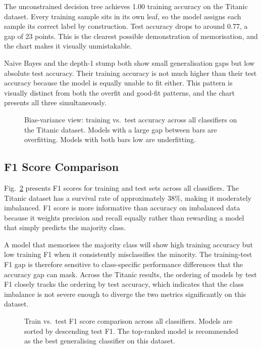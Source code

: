 \documentclass[conference]{IEEEtran}
\begin{document}
The unconstrained decision tree achieves 1.00 training accuracy on the Titanic dataset. Every training sample sits in its own leaf, so the model assigns each sample its correct label by construction. Test accuracy drops to around 0.77, a gap of 23 points. This is the clearest possible demonstration of memorisation, and the chart makes it visually unmistakable.

Naive Bayes and the depth-1 stump both show small generalisation gaps but low absolute test accuracy. Their training accuracy is not much higher than their test accuracy because the model is equally unable to fit either. This pattern is visually distinct from both the overfit and good-fit patterns, and the chart presents all three simultaneously.

\begin{figure}[t]
    \centering
    \caption{Bias-variance view: training vs.\ test accuracy across all classifiers on the Titanic dataset. Models with a large gap between bars are overfitting. Models with both bars low are underfitting.}
    \label{fig:bv_chart}
\end{figure}

\subsection{F1 Score Comparison}

Fig.~\ref{fig:f1_chart} presents F1 scores for training and test sets across all classifiers. The Titanic dataset has a survival rate of approximately 38\%, making it moderately imbalanced. F1 score is more informative than accuracy on imbalanced data because it weights precision and recall equally rather than rewarding a model that simply predicts the majority class.

A model that memorises the majority class will show high training accuracy but low training F1 when it consistently misclassifies the minority. The training-test F1 gap is therefore sensitive to class-specific performance differences that the accuracy gap can mask. Across the Titanic results, the ordering of models by test F1 closely tracks the ordering by test accuracy, which indicates that the class imbalance is not severe enough to diverge the two metrics significantly on this dataset.

\begin{figure}[t]
    \centering
    \caption{Train vs.\ test F1 score comparison across all classifiers. Models are sorted by descending test F1. The top-ranked model is recommended as the best generalising classifier on this dataset.}
    \label{fig:f1_chart}
\end{figure}
\end{document}
